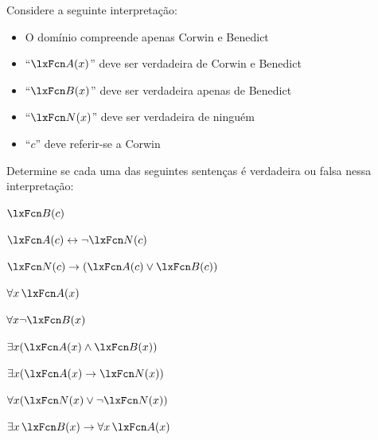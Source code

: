 \practiceproblems
\solutions
\problempart
\label{pr.TorF1}
Considere a seguinte interpretação:
	\begin{itemize}
\item O domínio compreende apenas Corwin e Benedict
\item \textquotedblleft $\atom{A}{x}$\textquotedblright{} deve ser verdadeira de Corwin e Benedict
\item \textquotedblleft $\atom{B}{x}$\textquotedblright{} deve ser verdadeira apenas de Benedict
\item \textquotedblleft $\atom{N}{x}$\textquotedblright{} deve ser verdadeira de ninguém
\item \textquotedblleft $c$\textquotedblright{} deve referir-se a Corwin
	\end{itemize}
Determine se cada uma das seguintes sentenças é verdadeira ou falsa nessa interpretação:
\begin{compactlist}
\item $\atom{B}{c} $
\item $\atom{A}{c}  \eiff \enot \atom{N}{c}$
\item $\atom{N}{c}  \eif (\atom{A}{c} \eor \atom{B}{c})$
\item $\forall x\, \atom{A}{x}$
\item $\forall x \enot \atom{B}{x}$
\item $\exists x(\atom{A}{x} \eand \atom{B}{x})$
\item $\exists x(\atom{A}{x} \eif \atom{N}{x})$
\item $\forall x(\atom{N}{x} \eor \enot \atom{N}{x})$
\item $\exists x\, \atom{B}{x} \eif \forall x\, \atom{A}{x}$
\end{compactlist}

